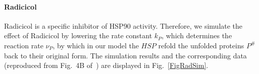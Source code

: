 \documentclass[oneside, 10pt, a4paper, twocolumn]{article}
\begin{document}






\paragraph{Radicicol}

Radicicol is a specific inhibitor of HSP90 activity.
Therefore, we simulate the effect of Radicicol by lowering the rate constant $k_P$,
which determines the reaction rate $\nu_P$, by which in our model the $HSP$ refold the unfolded proteins $P^\#$ back to their original form. 
The simulation results and the corresponding data (reproduced from Fig.~4B of~\cite{Schmollinger2013}) are
displayed in Fig.~\ref{FigRadSim}.
\end{document}
